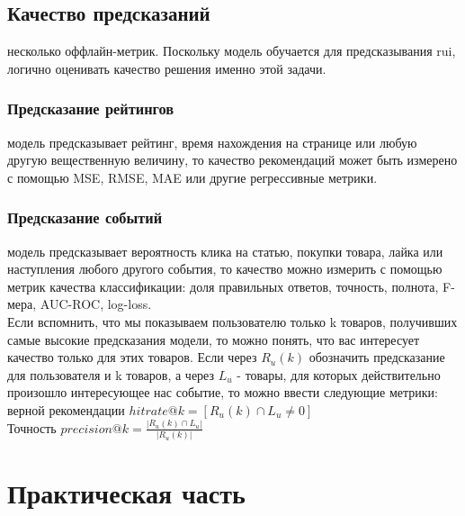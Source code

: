 \documentclass{article}
\newcommand\tab[1][1cm]{\hspace*{#1}}
\begin{document}
\subsection{Качество предсказаний}
 несколько оффлайн-метрик. Поскольку модель обучается для предсказывания rui, логично оценивать качество решения именно этой задачи.\\
\subsubsection{Предсказание рейтингов}
 модель предсказывает рейтинг, время нахождения на странице или любую другую вещественную величину, то качество рекомендаций может быть измерено с помощью ﻿MSE﻿, ﻿RMSE, ﻿MAE﻿ или другие регрессивные метрики.\\
\subsubsection{Предсказание событий}
 модель предсказывает вероятность клика на статью, покупки товара, лайка или наступления любого другого события, то качество можно измерить с помощью метрик качества классификации: доля правильных ответов, точность, полнота, F-мера, AUC-ROC, log-loss.\\
Если вспомнить, что мы показываем пользователю только ﻿k﻿ товаров, получивших самые высокие предсказания модели, то можно понять, что вас интересует качество только для этих товаров. Если через ﻿$R_u(k)$ обозначить предсказание для пользователя и ﻿k товаров, а через $L_u$ - товары, для которых действительно произошло интересующее нас событие, то можно ввести следующие метрики:\\
 верной рекомендации $hitrate@k=[R_u(k)\cap L_u \neq 0]$\\
Точность $precision@k=\frac{|R_u(k)\cap L_u|}{|R_u(k)|}$




















\newpage
\section{Практическая часть}
\end{document}
